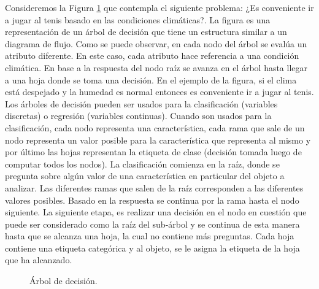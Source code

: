 	Consideremos la Figura \ref{fig: Arbol de decision} que contempla el siguiente problema: ¿Es conveniente ir a jugar al tenis basado en las condiciones climáticas?. La figura es una representación de un árbol de decisión que tiene un estructura similar a un diagrama de flujo. Como se puede observar, en cada nodo del árbol se evalúa un atributo diferente. En este caso, cada atributo hace referencia a una condición climática. En base a la respuesta del nodo raíz se avanza en el árbol hasta llegar a una hoja donde se toma una decisión. En el ejemplo de la figura, si el clima está despejado y la humedad es normal entonces es conveniente ir a jugar al tenis. Los árboles de decisión pueden ser usados para la clasificación (variables discretas) o regresión (variables continuas). Cuando son usados para la clasificación, cada nodo representa una característica, cada rama que sale de un nodo representa un valor posible para la característica que representa al mismo y por último las hojas representan la etiqueta de clase (decisión tomada luego de computar todos los nodos). La clasificación comienza en la raíz, donde se pregunta sobre algún valor de una característica en particular del objeto a analizar. Las diferentes ramas que salen de la  raíz corresponden a las diferentes valores posibles. Basado en la respuesta se continua por la rama hasta el nodo siguiente. La siguiente etapa, es realizar una decisión en el nodo en cuestión que puede ser considerado como la raíz del sub-árbol y se continua de esta manera hasta que se alcanza una hoja, la cual no contiene más preguntas. Cada hoja contiene una etiqueta categórica y al objeto, se le asigna la etiqueta de la hoja que ha alcanzado.
	
		\begin{figure}[htbp]
			\centering
			\caption{Árbol de decisión.}
			\label{fig: Arbol de decision}
		\end{figure}
		
